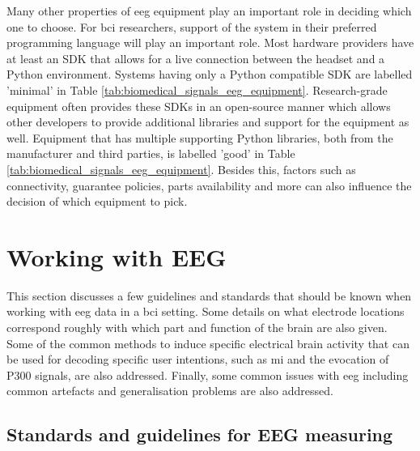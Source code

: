 Many other properties of \gls{eeg} equipment play an important role in deciding which one to choose.
For \gls{bci} researchers, support of the system in their preferred programming language will play an important role.
Most hardware providers have at least an SDK that allows for a live connection between the headset and a Python environment.
Systems having only a Python compatible SDK are labelled 'minimal' in Table \ref{tab:biomedical_signals_eeg_equipment}.
Research-grade equipment often provides these SDKs in an open-source manner which allows other developers to provide additional libraries and support for the equipment as well. 
Equipment that has multiple supporting Python libraries, both from the manufacturer and third parties, is labelled 'good' in Table \ref{tab:biomedical_signals_eeg_equipment}.
Besides this, factors such as connectivity, guarantee policies, parts availability and more can also influence the decision of which equipment to pick.





\section{Working with EEG}
\label{sec:biomedical_signals_working_with_eeg}

This section discusses a few guidelines and standards that should be known when working with \gls{eeg} data in a \gls{bci} setting.
Some details on what electrode locations correspond roughly with which part and function of the brain are also given.
Some of the common methods to induce specific electrical brain activity that can be used for decoding specific user intentions, such as \gls{mi} and the evocation of P300 signals, are also addressed.
Finally, some common issues with \gls{eeg} including common artefacts and generalisation problems are also addressed.



\subsection{Standards and guidelines for EEG measuring}
\label{subsec:biomedical_signals_working_with_eeg_standards}


